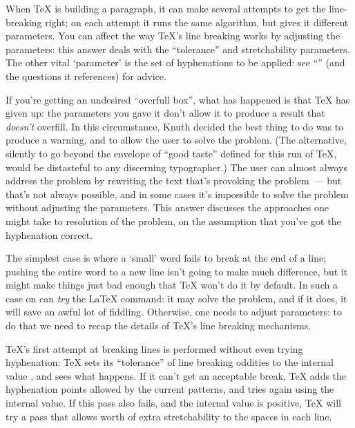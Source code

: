 
When \TeX{} is building a paragraph, it can make several attempts to
get the line-breaking right; on each attempt it runs the same
algorithm, but gives it different parameters.  You can affect the way
\TeX{}'s line breaking works by adjusting the parameters: this answer
deals with the ``tolerance'' and stretchability parameters.  The other
vital `parameter' is the set of hyphenations to be applied: see
``''
(and the questions it references) for advice.

If you're getting an undesired ``overfull box'', what has happened is
that \TeX{} has given up: the parameters you gave it don't allow it to
produce a result that \emph{doesn't} overfill.  In this circumstance,
Knuth decided the best thing to do was to produce a warning, and to
allow the user to solve the problem.  (The alternative, silently to go
beyond the envelope of ``good taste'' defined for this run of \TeX{},
would be distasteful to any discerning typographer.)  The user can
almost always address the problem by rewriting the text that's
provoking the problem~--- but that's not always possible, and in some
cases it's impossible to solve the problem without adjusting the
parameters.  This answer discusses the approaches one might take to
resolution of the problem, on the assumption that you've got the
hyphenation correct.

The simplest case is where a `small' word fails to break at the end of
a line; pushing the entire word to a new line isn't going to make much
difference, but it might make things just bad enough that \TeX{} won't
do it by default.  In such a case on can \emph{try} the \LaTeX{}
 command: it may solve the problem, and if it does, it
will save an awful lot of fiddling.  Otherwise, one needs to adjust
parameters: to do that we need to recap the details of \TeX{}'s line
breaking mechanisms.

\TeX{}'s first attempt at breaking lines is performed without even
trying hyphenation: \TeX{} sets its ``tolerance'' of line breaking
oddities to the internal value , and sees what
happens.  If it can't get an acceptable break, \TeX{} adds the
hyphenation points allowed by the current patterns, and tries again
using the internal  value.  If this pass also fails, and
the internal  value is positive, \TeX{} will try
a pass that allows  worth of extra stretchability
to the spaces in each line.

